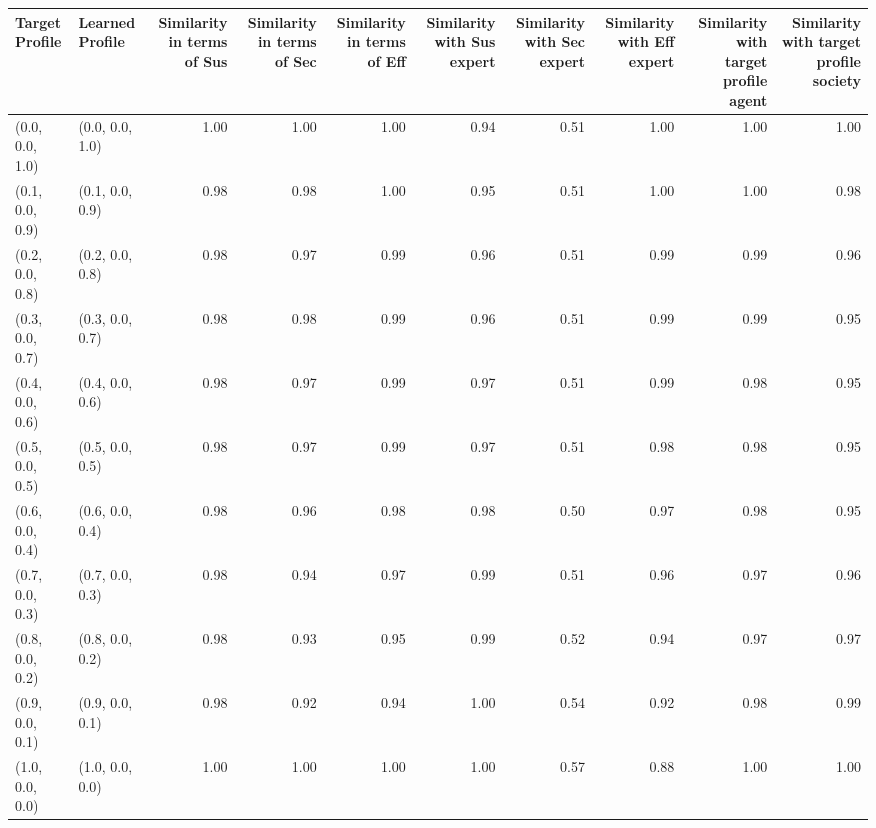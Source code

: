 \begin{tabular}{llrrrrrrrr}
\toprule
Target Profile & Learned Profile & Similarity in terms of Sus & Similarity in terms of Sec & Similarity in terms of Eff & Similarity with Sus expert & Similarity with Sec expert & Similarity with Eff expert & Similarity with target profile agent & Similarity with target profile society \\
\midrule
(0.0, 0.0, 1.0) & (0.0, 0.0, 1.0) & 1.00 & 1.00 & 1.00 & 0.94 & 0.51 & 1.00 & 1.00 & 1.00 \\
(0.1, 0.0, 0.9) & (0.1, 0.0, 0.9) & 0.98 & 0.98 & 1.00 & 0.95 & 0.51 & 1.00 & 1.00 & 0.98 \\
(0.2, 0.0, 0.8) & (0.2, 0.0, 0.8) & 0.98 & 0.97 & 0.99 & 0.96 & 0.51 & 0.99 & 0.99 & 0.96 \\
(0.3, 0.0, 0.7) & (0.3, 0.0, 0.7) & 0.98 & 0.98 & 0.99 & 0.96 & 0.51 & 0.99 & 0.99 & 0.95 \\
(0.4, 0.0, 0.6) & (0.4, 0.0, 0.6) & 0.98 & 0.97 & 0.99 & 0.97 & 0.51 & 0.99 & 0.98 & 0.95 \\
(0.5, 0.0, 0.5) & (0.5, 0.0, 0.5) & 0.98 & 0.97 & 0.99 & 0.97 & 0.51 & 0.98 & 0.98 & 0.95 \\
(0.6, 0.0, 0.4) & (0.6, 0.0, 0.4) & 0.98 & 0.96 & 0.98 & 0.98 & 0.50 & 0.97 & 0.98 & 0.95 \\
(0.7, 0.0, 0.3) & (0.7, 0.0, 0.3) & 0.98 & 0.94 & 0.97 & 0.99 & 0.51 & 0.96 & 0.97 & 0.96 \\
(0.8, 0.0, 0.2) & (0.8, 0.0, 0.2) & 0.98 & 0.93 & 0.95 & 0.99 & 0.52 & 0.94 & 0.97 & 0.97 \\
(0.9, 0.0, 0.1) & (0.9, 0.0, 0.1) & 0.98 & 0.92 & 0.94 & 1.00 & 0.54 & 0.92 & 0.98 & 0.99 \\
(1.0, 0.0, 0.0) & (1.0, 0.0, 0.0) & 1.00 & 1.00 & 1.00 & 1.00 & 0.57 & 0.88 & 1.00 & 1.00 \\
\bottomrule
\end{tabular}
